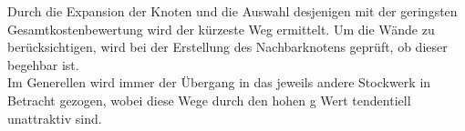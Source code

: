 \begin{flushleft}
\begin{enumerate}
  \end{enumerate}
  Durch die Expansion der Knoten und die Auswahl desjenigen mit der geringsten Gesamtkostenbewertung wird der kürzeste Weg ermittelt.
  Um die Wände zu berücksichtigen, wird bei der Erstellung des Nachbarknotens geprüft, ob dieser begehbar ist.\\
  Im Generellen wird immer der Übergang in das jeweils andere Stockwerk in Betracht gezogen,
  wobei diese Wege durch den hohen g Wert tendentiell unattraktiv sind.\\
\end{flushleft}
